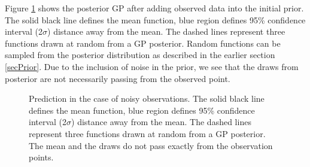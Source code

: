 Figure \ref{figGPNoisyPosteriors} shows the posterior GP after adding observed data into the initial prior. The solid black line defines the mean function, blue region defines 95\% confidence interval (2$\sigma$) distance away from the mean. The dashed lines represent three functions drawn at random from a GP posterior. Random functions can be sampled from the posterior distribution as described in the earlier section \ref{secPrior}.  Due to the inclusion of noise in the prior, we see that the draws from posterior are not necessarily passing from the observed point.

\begin{figure}[!ht]
  \centering
    \quad
{}\quad
  
       \caption{Prediction in the case of noisy observations. The solid black line defines the mean function, blue region defines 95\% confidence interval (2$\sigma$) distance away from the mean. The dashed lines represent three functions drawn at random from a GP posterior. The mean and the draws do not pass exactly from the observation points.}
       \label{figGPNoisyPosteriors}
\end{figure}

